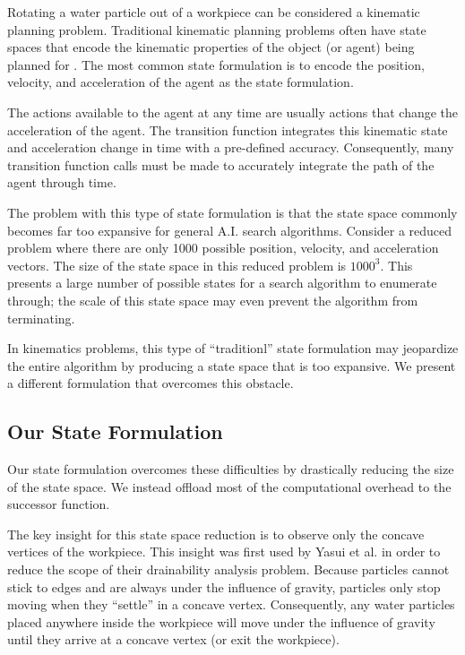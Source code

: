 Rotating a water particle out of a workpiece can be considered a kinematic planning problem. Traditional kinematic planning problems often have state spaces that encode the kinematic properties of the object (or agent) being planned for \cite{kuffner2000rrt}. The most common state formulation is to encode the position, velocity, and acceleration of the agent as the state formulation.

The actions available to the agent at any time are usually actions that change the acceleration of the agent. The transition function integrates this kinematic state and acceleration change in time with a pre-defined accuracy. Consequently, many transition function calls must be made to accurately integrate the path of the agent through time.

The problem with this type of state formulation is that the state space commonly becomes far too expansive for general A.I. search algorithms. Consider a reduced problem where there are only 1000 possible position, velocity, and acceleration vectors. The size of the state space in this reduced problem is $1000^3$. This presents a large number of possible states for a search algorithm to enumerate through; the scale of this state space may even prevent the algorithm from terminating.

In kinematics problems, this type of ``traditionl'' state formulation may jeopardize the entire algorithm by producing a state space that is too expansive. We present a different formulation that overcomes this obstacle.


	\subsection{Our State Formulation}

Our state formulation overcomes these difficulties by drastically reducing the size of the state space. We instead offload most of the computational overhead to the successor function.

The key insight for this state space reduction is to observe only the concave vertices of the workpiece. This insight was first used by Yasui et al. \cite{Yasui2011} in order to reduce the scope of their drainability analysis problem. Because particles cannot stick to edges and are always under the influence of gravity, particles only stop moving when they ``settle'' in a concave vertex. Consequently, any water particles placed anywhere inside the workpiece will move under the influence of gravity until they arrive at a concave vertex (or exit the workpiece).

